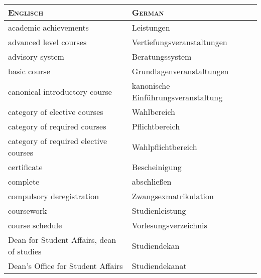 \begin{longtable} {|p{.5\linewidth}|p{.5\linewidth}|}
    \hline
    \textsc{Englisch}                                              & \textsc{German}                     \\
    \hline
    \hline
    academic achievements                                          & Leistungen                          \\
    \hline
    advanced level courses                                         & Vertiefungsveranstaltungen          \\
    \hline
    advisory system                                                & Beratungssystem                     \\
    \hline
    basic course                                                   & Grundlagenveranstaltungen           \\
    \hline
    canonical introductory course                                  & kanonische Einführungsveranstaltung \\
    \hline
    category of elective courses                                   & Wahlbereich                         \\
    \hline
    category of required courses                                   & Pflichtbereich                      \\
    \hline
    category of required elective courses                          & Wahlpflichtbereich                  \\
    \hline
    certificate                                                    & Bescheinigung                       \\
    \hline
    complete                                                       & abschließen                         \\
    \hline
    compulsory deregistration                                      & Zwangsexmatrikulation               \\
    \hline
    coursework                                                     & Studienleistung                     \\
    \hline
    course schedule                                                & Vorlesungsverzeichnis               \\
    \hline
    Dean for Student Affairs, dean of studies                      & Studiendekan                        \\
    \hline
    Dean's Office for Student Affairs                              & Studiendekanat                      \\

\end{longtable}
